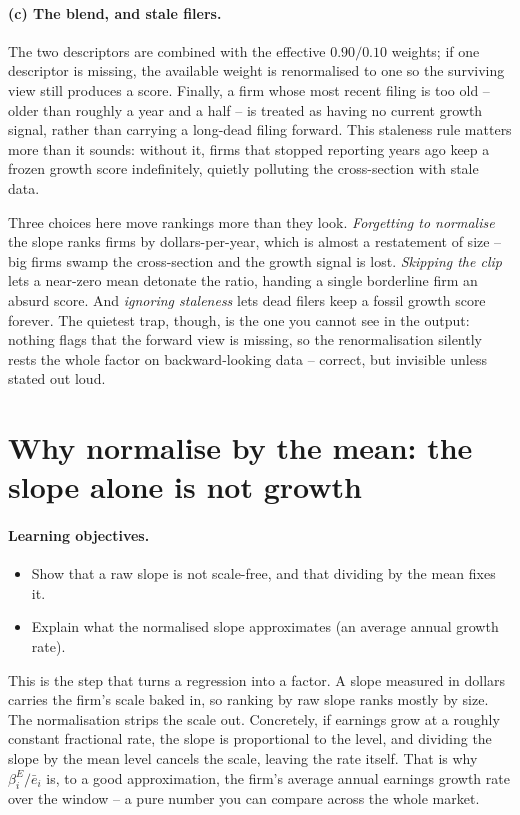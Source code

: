 \documentclass[11pt]{article}
\theoremstyle{definition}
\theoremstyle{plain}
\theoremstyle{remark}
\begin{document}
\paragraph{(c) The blend, and stale filers.} The two descriptors are combined with the effective $0.90 / 0.10$ weights; if one descriptor is missing, the available weight is renormalised to one so the surviving view still produces a score. Finally, a firm whose most recent filing is too old -- older than roughly a year and a half -- is treated as having no current growth signal, rather than carrying a long-dead filing forward. This staleness rule matters more than it sounds: without it, firms that stopped reporting years ago keep a frozen growth score indefinitely, quietly polluting the cross-section with stale data.

\begin{pitfall}
Three choices here move rankings more than they look. \emph{Forgetting to normalise} the slope ranks firms by dollars-per-year, which is almost a restatement of size -- big firms swamp the cross-section and the growth signal is lost. \emph{Skipping the clip} lets a near-zero mean detonate the ratio, handing a single borderline firm an absurd score. And \emph{ignoring staleness} lets dead filers keep a fossil growth score forever. The quietest trap, though, is the one you cannot see in the output: nothing flags that the forward view is missing, so the renormalisation silently rests the whole factor on backward-looking data -- correct, but invisible unless stated out loud.
\end{pitfall}

\section{Why normalise by the mean: the slope alone is not growth}\label{sec:slope}

\paragraph{Learning objectives.}
\begin{itemize}[leftmargin=1.4em,topsep=2pt]
  \item Show that a raw slope is not scale-free, and that dividing by the mean fixes it.
  \item Explain what the normalised slope approximates (an average annual growth rate).
\end{itemize}

This is the step that turns a regression into a factor. A slope measured in dollars carries the firm's scale baked in, so ranking by raw slope ranks mostly by size. The normalisation strips the scale out. Concretely, if earnings grow at a roughly constant fractional rate, the slope is proportional to the level, and dividing the slope by the mean level cancels the scale, leaving the rate itself. That is why $\beta^{E}_i / \bar e_i$ is, to a good approximation, the firm's average annual earnings growth rate over the window -- a pure number you can compare across the whole market.
\end{document}
